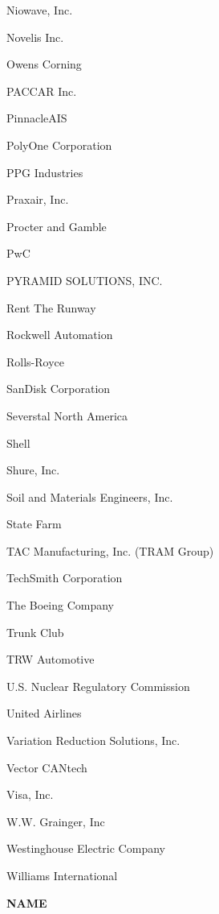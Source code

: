 \documentclass[twoside]{article}
\begin{document}
\begin{center}
\begin{multicols}{5}
\begin{FlushLeft}
\begin{compactitem}
\item Niowave, Inc.
\item Novelis Inc.
\item Owens Corning
\item PACCAR Inc.
\item PinnacleAIS
\item PolyOne Corporation
\item PPG Industries
\item Praxair, Inc.
\item Procter and Gamble
\item PwC
\item PYRAMID SOLUTIONS, INC.
\item Rent The Runway
\item Rockwell Automation
\item Rolls-Royce
\item SanDisk Corporation
\item Severstal North America
\item Shell
\item Shure, Inc.
\item Soil and Materials Engineers, Inc.
\item State Farm
\item TAC Manufacturing, Inc. (TRAM Group)
\item TechSmith Corporation
\item The Boeing Company
\item Trunk Club
\item TRW Automotive
\item U.S. Nuclear Regulatory Commission
\item United Airlines
\item Variation Reduction Solutions, Inc.
\item Vector CANtech
\item Visa, Inc.
\item W.W. Grainger, Inc
\item Westinghouse Electric Company
\item Williams International
\end{compactitem}
        \end{FlushLeft}
        \vspace{1em}
        {\fontsize{14}{16}\selectfont \bf NAME}\\
        \vspace{-1em}
        ~\hrulefill~
        \vspace{-.9em}
        \begin{FlushLeft}

\end{FlushLeft}
\end{multicols}
\end{center}
\end{document}
